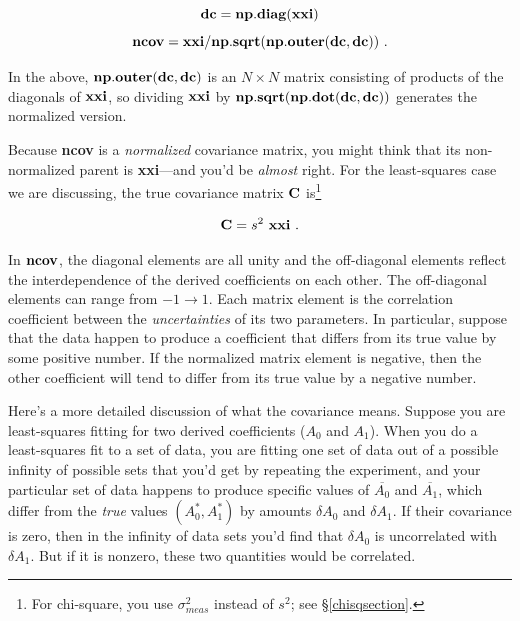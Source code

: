 \documentclass[psfig,preprint]{aastex}
\begin{document}
\begin{mathletters} \label{idlcovariance}
\begin{equation}
{\bf dc = np.diag(xxi)}
\end{equation}
\begin{equation}
{\bf ncov = xxi/np.sqrt(np.outer(dc,dc))} \ .
\end{equation}
\end{mathletters}

\noindent In the above, ${\bf np.outer(dc, dc)}$ is an $N \times N$ matrix
consisting of products of the diagonals of ${\bf xxi}$, so dividing
${\bf xxi}$ by ${\bf np.sqrt(np.dot(dc,dc))}$ generates the normalized version. 

	Because {\bf ncov} is a {\it normalized} covariance matrix, you
might think that its non-normalized parent is {\bf xxi}---and you'd be
{\it almost} right.  For the least-squares case we are discussing, the
true covariance matrix ${\bf C}$ is\footnote{For chi-square, you use
$\sigma_{meas}^2$ instead of $s^2$; see \S \ref{chisqsection}.}

\begin{equation}
{\bf C} = s^2 \ {\bf xxi} \ .
\end{equation}

	In ${\bf ncov}$, the diagonal elements are all unity and the
off-diagonal elements reflect the interdependence of the derived
coefficients on each other.  The off-diagonal elements can range from
$-1 \rightarrow 1$. Each matrix element is the correlation coefficient
between the {\it uncertainties} of its two parameters. In particular,
suppose that the data happen to produce a coefficient that differs from
its true value by some positive number. If the normalized matrix element
is negative, then the other coefficient will tend to differ from its
true value by a negative number. 

	Here's a more detailed discussion of what the covariance means. 
Suppose you are least-squares fitting for two derived coefficients
($A_0$ and $A_1$).  When you do a least-squares fit to a set of data,
you are fitting one set of data out of a possible infinity of possible
sets that you'd get by repeating the experiment, and your particular set
of data happens to produce specific values of $\overline{ A_0}$ and $\overline{
A_1}$, which differ from the {\it true} values $(A_0^*, A_1^*)$ by
amounts $\delta A_0$ and $\delta A_1$.  If their covariance is zero,
then in the infinity of data sets you'd find that $\delta A_0$ is
uncorrelated with $\delta A_1$.  But if it is nonzero, these two
quantities would be correlated. 
\end{document}
